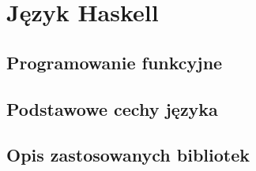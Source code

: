 \chapter{Język Haskell}
\label{cha:haskell}

\section{Programowanie funkcyjne}
\label{sec:architektura}

\section{Podstawowe cechy języka}
\label{sec:cechyjezyka}

\section{Opis zastosowanych bibliotek}
\label{sec:cechyjezyka}